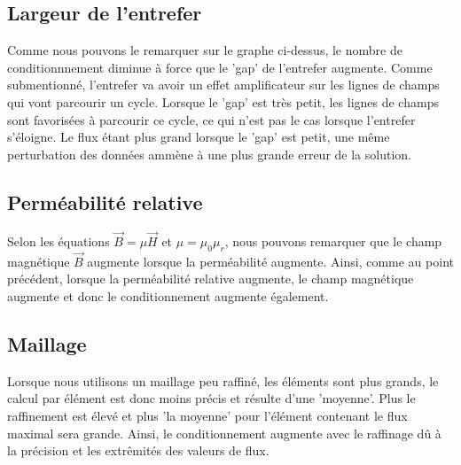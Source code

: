 \documentclass{article}[11pt]
\begin{document}
\subsection{Largeur de l'entrefer}

Comme nous pouvons le remarquer sur le graphe ci-dessus, le nombre de conditionnnement diminue à force que le 'gap' de l'entrefer augmente. Comme submentionné, l'entrefer va avoir un effet amplificateur sur les lignes de champs qui vont parcourir un cycle. Lorsque le 'gap' est très petit, les lignes de champs sont favorisées à parcourir ce cycle, ce qui n'est pas le cas lorsque l'entrefer s'éloigne. Le flux étant plus grand lorsque le 'gap' est petit, une même perturbation des données ammène à une plus grande erreur de la solution.
\subsection{Perméabilité relative}

Selon les équations $\overrightarrow{B} = \mu\overrightarrow{H}$ et $\mu = \mu_0\mu_r$, nous pouvons remarquer que le champ magnétique $\overrightarrow{B}$ augmente lorsque la perméabilité augmente. Ainsi, comme au point précédent, lorsque la perméabilité relative augmente, le champ magnétique augmente et donc le conditionnement augmente également.
\subsection{Maillage}

Lorsque nous utilisons un maillage peu raffiné, les éléments sont plus grands, le calcul par élément est donc moins précis et résulte d'une 'moyenne'. Plus le raffinement est élevé et plus 'la moyenne' pour l'élément contenant le flux maximal sera grande. Ainsi, le conditionnement augmente avec le raffinage dû à la précision et les extrêmités des valeurs de flux.
\end{document}
